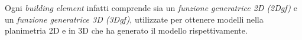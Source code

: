 Ogni \emph{building element} infatti comprende sia un \emph{funzione generatrice 2D (2Dgf)} e un
\emph{funzione generatrice 3D (3Dgf)}, utilizzate per ottenere modelli nella planimetria 2D e in 3D che ha generato il modello
rispettivamente.

